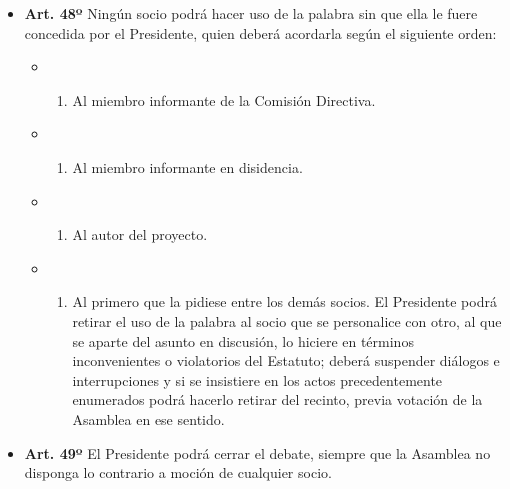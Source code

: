 \documentclass[]{book}
\providecommand{\tightlist}{%
  \setlength{\itemsep}{0pt}\setlength{\parskip}{0pt}}
\begin{document}
\begin{itemize}
\tightlist
\item
  \textbf{Art. 48º} Ningún socio podrá hacer uso de la palabra sin que
  ella le fuere concedida por el Presidente, quien deberá acordarla
  según el siguiente orden:

  \begin{itemize}
  \item
    \begin{enumerate}
    \def\labelenumi{\alph{enumi})}
    \tightlist
    \item
      Al miembro informante de la Comisión Directiva.
    \end{enumerate}
  \item
    \begin{enumerate}
    \def\labelenumi{\alph{enumi})}
    \setcounter{enumi}{1}
    \tightlist
    \item
      Al miembro informante en disidencia.
    \end{enumerate}
  \item
    \begin{enumerate}
    \def\labelenumi{\alph{enumi})}
    \setcounter{enumi}{2}
    \tightlist
    \item
      Al autor del proyecto.
    \end{enumerate}
  \item
    \begin{enumerate}
    \def\labelenumi{\alph{enumi})}
    \setcounter{enumi}{3}
    \tightlist
    \item
      Al primero que la pidiese entre los demás socios. El Presidente
      podrá retirar el uso de la palabra al socio que se personalice con
      otro, al que se aparte del asunto en discusión, lo hiciere en
      términos inconvenientes o violatorios del Estatuto; deberá
      suspender diálogos e interrupciones y si se insistiere en los
      actos precedentemente enumerados podrá hacerlo retirar del
      recinto, previa votación de la Asamblea en ese sentido.
    \end{enumerate}
  \end{itemize}
\end{itemize}

\begin{itemize}
\tightlist
\item
  \textbf{Art. 49º} El Presidente podrá cerrar el debate, siempre que la
  Asamblea no disponga lo contrario a moción de cualquier socio.
\end{itemize}
\end{document}
